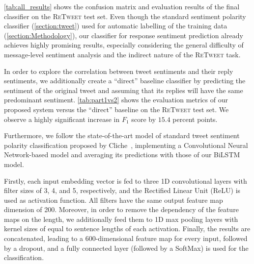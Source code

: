 \documentclass[conference]{IEEEtran}
\newcommand{\retweet}{\textsc{ReTweet}\xspace}
\begin{document}
\cref{tab:all_results} shows the confusion matrix and evaluation results of the final classifier on the \retweet test set. 
Even though the standard sentiment polarity classifier  (\cref{section:tweet}) used for automatic labelling of the training data (\cref{section:Methodology}), our classifier for response sentiment prediction already achieves highly promising results, especially
considering the general difficulty of message-level sentiment analysis and the indirect nature of the \retweet task.

In order to explore the correlation between tweet sentiments and their reply sentiments, we additionally create a ``direct'' baseline classifier by predicting the sentiment of the original tweet and assuming that its replies will have the same predominant sentiment.
\cref{tab:part1vs2} shows the evaluation metrics of our proposed system versus the ``direct'' baseline on the \retweet test set.  We observe a highly significant increase in $F_1$ score by $15.4$ percent points.

\begin{table}[t]
\centering
{}
\qquad
{}
\caption{ evaluation results of the final classifier on the \retweet test set. F1 score, recall, and precision are calculated based on \cref{eq:one}. All results given in percent.  Detailed confusion matrix.}
\label{tab:all_results}
\end{table}



Furthermore,
we follow the state-of-the-art model of standard tweet sentiment polarity classification proposed by Cliche~\cite{cliche-2017-bb},
implementing a Convolutional Neural Network-based model and averaging its predictions with those of our BiLSTM model.

Firstly, each input embedding vector is fed to three 1D convolutional layers with filter sizes of 3, 4, and 5, respectively, and the Rectified Linear Unit (ReLU) is used as activation function. All filters have the same output feature map dimension of 200. Moreover, in order to remove the dependency of the feature maps on the length, we additionally feed them to 1D max pooling layers with kernel sizes of equal to sentence lengths of each activation. Finally, the results are concatenated, leading to a 600-dimensional feature map for every input, followed by a dropout, and a fully connected layer (followed by a SoftMax)
is used for the classification.
\end{document}
